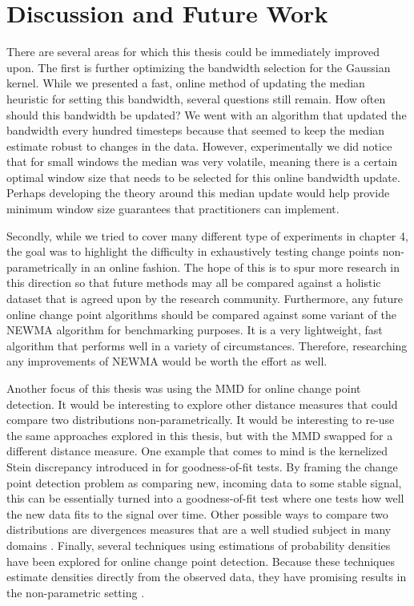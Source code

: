 \section{Discussion and Future Work}

There are several areas for which this thesis could be immediately improved upon. The first is further optimizing the bandwidth selection for the Gaussian kernel. While we presented a fast, online method of updating the median heuristic for setting this bandwidth, several questions still remain. How often should this bandwidth be updated? We went with an algorithm that updated the bandwidth every hundred timesteps because that seemed to keep the median estimate robust to changes in the data. However, experimentally we did notice that for small windows the median was very volatile, meaning there is a certain optimal window size that needs to be selected for this online bandwidth update. Perhaps developing the theory around this median update would help provide minimum window size guarantees that practitioners can implement.

Secondly, while we tried to cover many different type of experiments in chapter 4, the goal was to highlight the difficulty in exhaustively testing change points non-parametrically in an online fashion. The hope of this is to spur more research in this direction so that future methods may all be compared against a holistic dataset that is agreed upon by the research community. Furthermore, any future online change point algorithms should be compared against some variant of the NEWMA algorithm for benchmarking purposes. It is a very lightweight, fast algorithm that performs well in a variety of circumstances. Therefore, researching any improvements of NEWMA would be worth the effort as well. 

Another focus of this thesis was using the MMD for online change point detection. It would be interesting to explore other  distance measures that could compare two distributions non-parametrically. It would be interesting to re-use the same approaches explored in this thesis, but with the MMD swapped for a different distance measure. One example that comes to mind is the kernelized Stein discrepancy introduced in \cite{liu2016kernelized} for goodness-of-fit tests. By framing the change point detection problem as comparing new, incoming data to some stable signal, this can be essentially turned into a goodness-of-fit test where one tests how well the new data fits to the signal over time. Other possible ways to compare two distributions are divergences measures that are a well studied subject in many domains \cite{basseville2013divergence} \cite{pardo2018statistical}. Finally, several techniques using estimations of probability densities have been explored for online change point detection. Because these techniques estimate densities directly from the observed data, they have promising results in the non-parametric setting \cite{kawahara2012sequential} \cite{bouchikhi2019kernel}.

